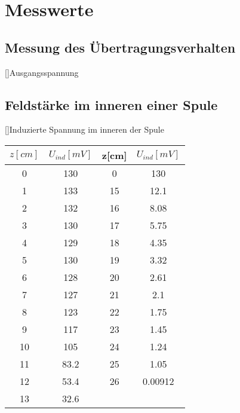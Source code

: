 \chapter{Messwerte}
\section{Messung des Übertragungsverhalten}
\begin{center}
[]{Ausgangsspannung}
\end{center}

\section{Feldstärke im inneren einer Spule}
\begin{center}
[]{Induzierte Spannung im inneren der Spule}
\begin{tabular}{c|c||c|c}
$z[cm]$&$U_{ind}[mV]$&z[cm]&$U_{ind}[mV]$ \\ \hline\hline
0& 130 & 0 & 130    \\
1& 133   & 15& 12.1 \\
2& 132   & 16& 8.08 \\
3& 130   & 17& 5.75 \\
4& 129   & 18& 4.35 \\
5& 130   & 19& 3.32 \\
6& 128   & 20& 2.61 \\
7& 127   & 21& 2.1  \\
8& 123   & 22& 1.75 \\
9& 117   & 23& 1.45 \\
10& 105  & 24& 1.24 \\
11& 83.2 & 25& 1.05 \\
12& 53.4 & 26& 0.00912 \\
13& 32.6 &  &
\end{tabular}
\end{center}


